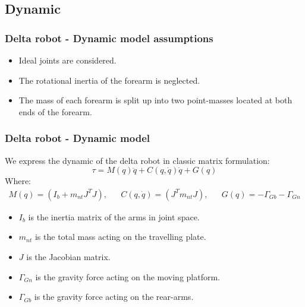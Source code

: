 \subsection{Dynamic}
\begin{frame}
\frametitle{Delta robot - Dynamic model assumptions}
\begin{itemize}
	\item Ideal joints are considered.
	\item The rotational inertia of the forearm is neglected.
	\item The mass of each forearm is split up into two point-masses located at both ends of the forearm.
\end{itemize}
\end{frame}
%
\begin{frame}
\frametitle{Delta robot - Dynamic model}
We express the dynamic of the delta robot in classic matrix formulation:
\begin{equation}
	\tau = M(q)\ddot{q} + C(q,\dot{q})\dot{q} + G(q)
\end{equation}
Where:
\begin{align*}
	M(q) = \left(I_b + m_{nt}J^TJ\right), && C(q,\dot{q}) = \left(J^Tm_{nt}J\right), && G(q) = -\Gamma_{Gb} - \Gamma_{Gn}
\end{align*}
\begin{itemize}
	\item $I_b$ is the inertia matrix of the arms in joint space.
	\item $m_{nt}$ is the total mass acting on the travelling plate.
	\item $J$ is the Jacobian matrix.
	\item $\Gamma_{Gn}$ is the gravity force acting on the moving platform.
	\item $\Gamma_{Gb}$ is the gravity force acting on the rear-arms.
\end{itemize}
\end{frame}
%
